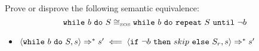 \begin{exercise}{
    Prove or disprove the following semantic equivalence:
    \[ \texttt{while}\ b\ \texttt{do}\ S \cong_{\text{\tiny SOS}} \texttt{while}\ b\ \texttt{do}\ \texttt{repeat}\ S\ \texttt{until}\ \neg b  \]\vspace*{-0.6cm}
}
\begin{itemize}
\begin{itemize}
\begin{itemize}
                    \begin{gather*}
                        \instr{\wif{b}{(S; \wwhile{b}{S})}{skip}}{s}
                        \Rightarrow
                        \instr{skip}{s}
                        \Rightarrow s
                        \\
                        \instr{\wif{\neg b}{skip}{S_r}}{s}
                        \Rightarrow
                        \instr{skip}{s}
                        \Rightarrow s
                    \end{gather*}
                    \item $\Bool{b} s = \text{tt}$
                        \begin{align*}
                            &\instr{\wif{b}{(S; \wwhile{b}{S})}{skip}}{s}
                            \\&\qquad\Rightarrow \instr{S; \wwhile{b}{S}}{s}
                            \\&\qquad\Rightarrow^{k-1} s'
                        \end{align*}
                        By the decomposition lemma $\exists k_1, k_2 :$
                        \begin{gather*}
                            k_1 + k_2 = k - 2 \qquad\quad
                            \instr{S}{s} \Rightarrow^{k_1} s'' \qquad\quad
                            \instr{\wwhile{b}{S}}{s''} \Rightarrow^{k_2} s'
                        \end{gather*}
                        Then
                        \begin{align*}
                            &\instr{\wif{\neg b}{skip}{S_r}}{s}
                            \\&\quad\Rightarrow \instr{S_r}{s}
                            \\&\quad\Rightarrow \instr{S; \wif{\neg b}{skip}{S_r}}{s}
                            &&\text{(By the composition lemma)}
                            \\&\quad\Rightarrow^* \instr{\wif{\neg b}{skip}{S_r}}{s''}
                        \end{align*}
                        And since $\instr{\wwhile{b}{S}}{s''} \Rightarrow^{k_2} s'$ and $k_2 = k - 2 - k_1 \leq k$  we can apply the inductive hypothesis and get
                        \[ \instr{\wif{\neg b}{skip}{S_r}}{s''} \Rightarrow s' \]
                \end{itemize}
            \end{itemize}
        \item $\left<\texttt{while}\ b\ \texttt{do}\ S, s\right> \Rightarrow^* s' \impliedby \left<\texttt{if}\ \neg b\ \texttt{then}\ skip\ \texttt{else}\ S_r, s\right> \Rightarrow^* s'$ \\

\end{itemize}
\end{exercise}
